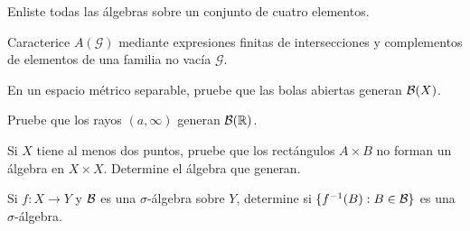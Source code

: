 \begin{ejercicio}\label{ej:v2-l01-4}
Enliste todas las álgebras sobre un conjunto de cuatro elementos.
\end{ejercicio}

\begin{ejercicio}\label{ej:v2-l01-5}
Caracterice $A(\mathcal G)$ mediante expresiones finitas de intersecciones y complementos de elementos de una familia no vacía $\mathcal G$.
\end{ejercicio}

\begin{ejercicio}\label{ej:v2-l01-6}
En un espacio métrico separable, pruebe que las bolas abiertas generan $\mathcal B(X)$.
\end{ejercicio}

\begin{ejercicio}\label{ej:v2-l01-7}
Pruebe que los rayos $(a,\infty)$ generan $\mathcal B(\mathbb R)$.
\end{ejercicio}

\begin{ejercicio}\label{ej:v2-l01-8}
Si $X$ tiene al menos dos puntos, pruebe que los rectángulos $A\times B$ no forman un álgebra en $X\times X$. Determine el álgebra que generan.
\end{ejercicio}

\begin{ejercicio}\label{ej:v2-l01-9}
Si $f:X\to Y$ y $\mathcal B$ es una $\sigma$-álgebra sobre $Y$, determine si $\{f^{-1}(B):B\in\mathcal B\}$ es una $\sigma$-álgebra.
\end{ejercicio}


